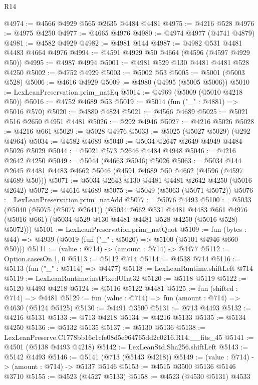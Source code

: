 \begin{lexlean}{R14}
\begin{coremodule}
@4974 := @4566 @4929 @565 @2635 @4484 @4481
@4975 := @4216 @528
@4976 := @4975 @4250
@4977 := @4665 @4976
@4980 := @4974 @4977 (@4741 @4879)
@4981 := @4582 @4929
@4982 := @4981 @144
@4987 := @4982 @531 @4481 @4483 @4664 @4976
@4994 := @4591 @4929 @50 @4664 (@4596 (@4597 @4929 @50))
@4995 := @4987 @4994
@5001 := @4981 @529 @130 @4481 @4481 @528 @4250
@5002 := @4752 @4929
@5003 := @5002 @53
@5005 := @5001 (@5003 @528)
@5006 := @4616 @4929
@5009 := @4980 (@4995 (@5005 @5006))
@5010 := LexLeanPreservation.prim_natEq
@5014 := @4969 (@5009 (@5010 @4218 @50))
@5016 := @4752 @4689 @53
@5019 := @5014 (fun ("_" : @4881) => @5016 @570)
@5020 := @4880 @4824
@5021 := @4566 @4689
@5025 := @5021 @516 @2650 @4951 @4481
@5026 := @292 @4946
@5027 := @4216 @5026
@5028 := @4216 @661
@5029 := @5028 @4976
@5033 := @5025 (@5027 @5029) (@292 @4964)
@5034 := @4582 @4689
@5040 := @5034 @2647 @2649 @4949 @4484 @5026 @5029
@5044 := @5021 @573 @2646 @4484 @4948
@5046 := @4216 @2642 @4250
@5049 := @5044 (@4663 @5046) @5026
@5063 := @5034 @144 @2645 @4481 @4483 @4662 @5046 (@4591 @4689 @50 @4662 (@4596 (@4597 @4689 @50)))
@5071 := @5034 @2643 @130 @4481 @4481 @2642 @4250 (@5016 @2642)
@5072 := @4616 @4689
@5075 := @5049 (@5063 (@5071 @5072))
@5076 := LexLeanPreservation.prim_natAdd
@5077 := @5076 @4493
@5100 := @5033
    (@5040
      (@5075 (@5077 @2641))
      (@5034
        @662
        @531
        @4481
        @4483
        @661
        @4976
        (@5016 @661)
        (@5034 @529 @130 @4481 @4481 @528 @4250 (@5016 @528) @5072)))
@5101 := LexLeanPreservation.prim_natQuot
@5109 := fun (bytes : @44) => @4939 (@5019 (fun ("_" : @5020) => @5100 (@5101 @4946 @660 @50)))
@5111 := (value : @714) -> (amount : @714) -> @4477
@5112 := Option.casesOn.{1, 0}
@5113 := @5112 @714
@5114 := @4538 @714
@5116 := @5113 (fun ("_" : @5114) => @4477)
@5118 := LexLeanRuntime.shiftLeft @714
@5119 := LexLeanRuntime.instFixedUInt32
@5120 := @5118 @5119
@5122 := @5120 @4493 @4218
@5124 := @5116 @5122 @4481
@5125 := fun (shifted : @714) => @4481
@5129 := fun (value : @714) => fun (amount : @714) => @4630 (@5124 @5125)
@5130 := @4491 @3500
@5131 := @713 @4493
@5132 := @4216 @5131
@5133 := @713 @4218
@5134 := @4216 @5133
@5135 := @5134 @4250
@5136 := @5132 @5135
@5137 := @5130 @5136
@5138 := LexLeanPreserve.C1778bb16c1cfe08d5e964765dd2c0216.R14.__fits_45
@5141 := @4501 (@5138 @4493 @4218)
@5142 := LexLeanStd.Sha256.shiftLeft
@5143 := @5142 @4493
@5146 := @5141 (@713 (@5143 @4218))
@5149 := (value : @714) -> (amount : @714) -> @5137 @5146
@5153 := @4515 @3500 @5136 @5146 @3710
@5155 := @4523 (@4527 @5133)
@5158 := @4523 (@4530 @5131) @4533

\end{coremodule}
\end{lexlean}
